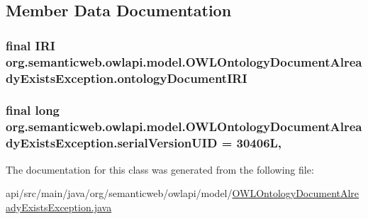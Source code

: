 \subsection{Member Data Documentation}
\hypertarget{classorg_1_1semanticweb_1_1owlapi_1_1model_1_1_o_w_l_ontology_document_already_exists_exception_a76fd2f2691f17524e0f9c483befa83ca}{
\subsubsection[{ontology\-Document\-I\-R\-I}]{\setlength{\rightskip}{0pt plus 5cm}final {\bf I\-R\-I} org.\-semanticweb.\-owlapi.\-model.\-O\-W\-L\-Ontology\-Document\-Already\-Exists\-Exception.\-ontology\-Document\-I\-R\-I\hspace{0.3cm}{\ttfamily [private]}}}\label{classorg_1_1semanticweb_1_1owlapi_1_1model_1_1_o_w_l_ontology_document_already_exists_exception_a76fd2f2691f17524e0f9c483befa83ca}
\hypertarget{classorg_1_1semanticweb_1_1owlapi_1_1model_1_1_o_w_l_ontology_document_already_exists_exception_abe2876c000261c205091627b80d7fe15}{
\subsubsection[{serial\-Version\-U\-I\-D}]{\setlength{\rightskip}{0pt plus 5cm}final long org.\-semanticweb.\-owlapi.\-model.\-O\-W\-L\-Ontology\-Document\-Already\-Exists\-Exception.\-serial\-Version\-U\-I\-D = 30406\-L\hspace{0.3cm}{\ttfamily [static]}, {\ttfamily [private]}}}\label{classorg_1_1semanticweb_1_1owlapi_1_1model_1_1_o_w_l_ontology_document_already_exists_exception_abe2876c000261c205091627b80d7fe15}


The documentation for this class was generated from the following file\-:\begin{DoxyCompactItemize}
\item 
api/src/main/java/org/semanticweb/owlapi/model/\hyperlink{_o_w_l_ontology_document_already_exists_exception_8java}{O\-W\-L\-Ontology\-Document\-Already\-Exists\-Exception.\-java}\end{DoxyCompactItemize}
